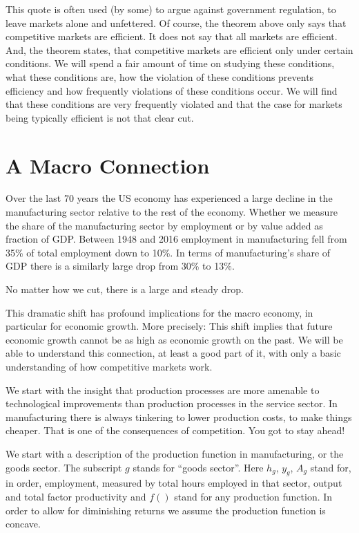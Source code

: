 \documentclass[
]{book}
\begin{document}
This quote is often used (by some) to argue against government regulation, to leave markets alone and unfettered. Of course, the theorem above only says that competitive markets are efficient. It does not say that all markets are efficient. And, the theorem states, that competitive markets are efficient only under certain conditions. We will spend a fair amount of time on studying these conditions, what these conditions are, how the violation of these conditions prevents efficiency and how frequently violations of these conditions occur. We will find that these conditions are very frequently violated and that the case for markets being typically efficient is not that clear cut.

\hypertarget{a-macro-connection}{%
\section{A Macro Connection}\label{a-macro-connection}}

Over the last 70 years the US economy has experienced a large decline in the manufacturing sector relative to the rest of the economy. Whether we measure the share of the manufacturing sector by employment or by value added as fraction of GDP. Between 1948 and 2016 employment in manufacturing fell from 35\% of total employment down to 10\%. In terms of manufacturing's share of GDP there is a similarly large drop from 30\% to 13\%.

No matter how we cut, there is a large and steady drop.

This dramatic shift has profound implications for the macro economy, in particular for economic growth. More precisely: This shift implies that future economic growth cannot be as high as economic growth on the past. We will be able to understand this connection, at least a good part of it, with only a basic understanding of how competitive markets work.

We start with the insight that production processes are more amenable to technological improvements than production processes in the service sector. In manufacturing there is always tinkering to lower production costs, to make things cheaper. That is one of the consequences of competition. You got to stay ahead!

We start with a description of the production function in manufacturing, or the goods sector. The subscript \(g\) stands for ``goods sector''. Here \(h_g\), \(y_g\), \(A_g\) stand for, in order, employment, measured by total hours employed in that sector, output and total factor productivity and \(f( )\) stand for any production function. In order to allow for diminishing returns we assume the production function is concave.
\end{document}
